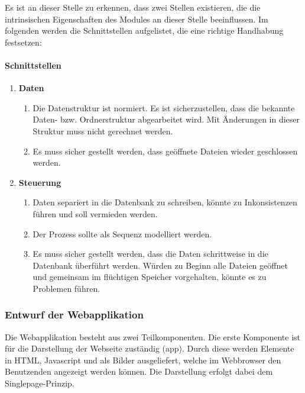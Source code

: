 Es ist an dieser Stelle zu erkennen, dass zwei Stellen existieren, die die intrinsischen Eigenschaften des Modules an dieser Stelle beeinflussen. Im folgenden werden die Schnittstellen aufgelistet, die eine richtige Handhabung festsetzen:

\pagebreak
\paragraph{Schnittstellen}

\begin{enumerate}

\item \textbf{Daten}
    \begin{enumerate}
        \item Die Datenstruktur ist normiert. Es ist sicherzustellen, dass die bekannte Daten- bzw. Ordnerstruktur abgearbeitet wird. Mit Änderungen in dieser Struktur muss nicht gerechnet werden.
        \item Es muss sicher gestellt werden, dass geöffnete Dateien wieder geschlossen werden.
    \end{enumerate}

\item \textbf{Steuerung}
    \begin{enumerate}
        \item Daten separiert in die Datenbank zu schreiben, könnte zu Inkonsistenzen führen und soll vermieden werden.
        \item Der Prozess sollte als Sequenz modelliert werden.
        \item Es muss sicher gestellt werden, dass die Daten schrittweise in die Datenbank überführt werden. Würden zu Beginn alle Dateien geöffnet und gemeinsam im flüchtigen Speicher vorgehalten, könnte es zu Problemen führen.
    \end{enumerate}

\end{enumerate}



\subsubsection{Entwurf der Webapplikation}

Die Webapplikation besteht aus zwei Teilkomponenten. Die erste Komponente ist für die Darstellung der Webseite zuständig (app). Durch diese werden Elemente in  HTML, Javascript und als Bilder ausgeliefert, welche im Webbrowser den Benutzenden angezeigt werden können. Die Darstellung erfolgt dabei dem Singlepage-Prinzip.

